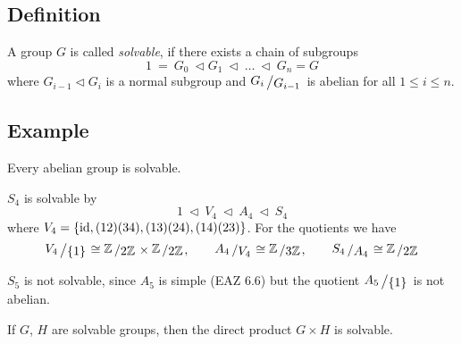 \documentclass[12pt]{book}
\newcommand{\slant}[2]{{\raisebox{.1em}{$#1$}\left/\raisebox{-.1em}{$#2$}\right.}}
\begin{document}
\begin{spacing}{1.3}
\subsection{Definition} %
A group $G$ is called \textit{solvable}, if there exists a chain of subgroups $$1\ =\ G_0 \ \triangleleft G_1\ \triangleleft \ \dots\ \triangleleft \ G_n=G$$ where $G_{i-1} \triangleleft G_i$ is a normal subgroup and $\slant{G_i}{G_{i-1}}$ is abelian for all $1 \leqslant i \leqslant n$.

\subsection*{Example} %
\titleformat{\subsection}{\normalfont\normalsize\bfseries}{}{0em}{#1 \thesubsection}
\begin{compactenum}
\item Every abelian group is solvable.
\item $S_4$ is solvable by $$1 \ \triangleleft\ V_4 \ \triangleleft \ A_4 \ \triangleleft\ S_4$$ where $V_4=\{\rm{id}, (12)(34), (13)(24), (14)(23)\}$. For the quotients we have $$\slant{V_4}{\{1\}} \cong \slant{\mathbb{Z}}{2 \mathbb{Z}} \times \slant{\mathbb{Z}}{2 \mathbb{Z}}, \qquad \slant{A_4}{V_4}\cong \slant{\mathbb{Z}}{3 \mathbb{Z}}, \qquad \slant{S_4}{A_4} \cong \slant{\mathbb{Z}}{2 \mathbb{Z}}$$
\item $S_5$ is not solvable, since $A_5$ is simple (EAZ 6.6) but the quotient $\slant{A_5}{\{1\}}$ is not abelian.
\item If $G$, $H$ are solvable groups, then the direct product $G \times H$ is solvable.
\end{compactenum}


\end{spacing}
\end{document}
